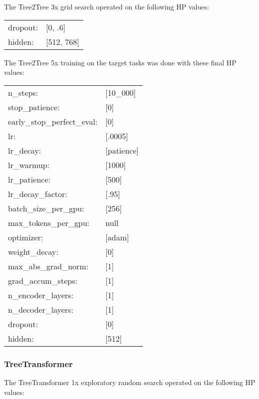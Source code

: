 \vskip 0.15in
The Tree2Tree 3x grid search operated on the following HP values: 

\begin{tabular}{ll}
    dropout: & [0, .6] \\
    hidden: & [512, 768] \\
\end{tabular}
\vskip 0.15in

The Tree2Tree 5x training on the target tasks was done with these final HP values:


\begin{tabular}{ll}
    n\_steps: & [10\_000]  \\
    stop\_patience: & [0] \\
    early\_stop\_perfect\_eval: & [0] \\
    lr: & [.0005] \\
    lr\_decay: & [patience] \\
    lr\_warmup: & [1000] \\
    lr\_patience: & [500] \\
    lr\_decay\_factor: & [.95] \\
    batch\_size\_per\_gpu: & [256] \\
    max\_tokens\_per\_gpu: &  null    \\
    optimizer: & [adam]     \\
    weight\_decay: & [0] \\
    max\_abs\_grad\_norm: & [1] \\
    grad\_accum\_steps: & [1] \\
    n\_encoder\_layers: & [1] \\
    n\_decoder\_layers: & [1] \\
    dropout: & [0] \\
    hidden: & [512] \\
\end{tabular}

\pagebreak

\subsubsection{TreeTransformer}

The TreeTransformer 1x exploratory random search operated on the following HP values: 

